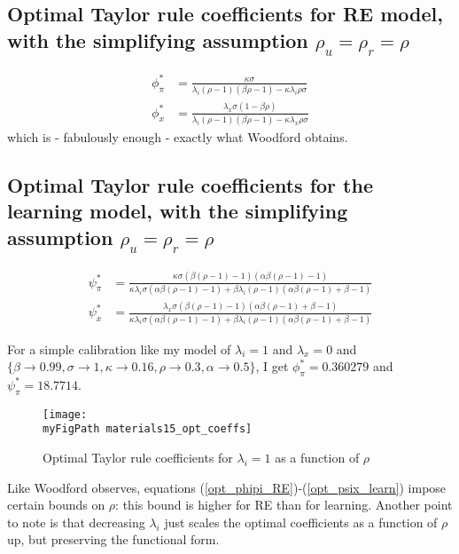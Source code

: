 \documentclass[11pt]{article}
\def \myFigPath {../figures/}
\renewcommand{\[}{\begin{equation}}
\renewcommand{\]}{\end{equation}}
\begin{document}
\newpage
\subsection{Optimal Taylor rule coefficients for RE model, with the simplifying assumption $\rho_u = \rho_r = \rho$}
\begin{align}
\phi_{\pi}^* & = \frac{\kappa  \sigma }{\lambda_i(\rho -1) (\beta  \rho -1)-\kappa  \lambda_i \rho  \sigma } \label{opt_phipi_RE}
\\
\phi_{x}^* & =  \frac{\lambda_x\sigma  (1-\beta  \rho )}{\lambda_i (\rho -1) (\beta  \rho -1)-\kappa  \lambda_x \rho  \sigma } \label{opt_phix_RE}
\end{align}
which is - fabulously enough - exactly what Woodford obtains.
\subsection{Optimal Taylor rule coefficients for the learning model, with the simplifying assumption $\rho_u = \rho_r = \rho$}
\begin{align}
\psi_{\pi}^* & =
\frac{\kappa  \sigma  (\beta  (\rho -1)-1) (\alpha  \beta  (\rho -1)-1)}{\kappa  \lambda_i \sigma  (\alpha  \beta  (\rho -1)-1)+\beta  \lambda_i (\rho -1) (\alpha  \beta  (\rho -1)+\beta -1)} \label{opt_psipi_learn} \\
\psi_{x}^* & = 
\frac{\lambda_x\sigma  (\beta  (\rho -1)-1) (\alpha  \beta  (\rho -1)+\beta -1)}{\kappa  \lambda_i \sigma  (\alpha  \beta  (\rho -1)-1)+\beta  \lambda_i (\rho -1) (\alpha  \beta  (\rho -1)+\beta -1)} \label{opt_psix_learn}
\end{align}

For a simple calibration like my model of $\lambda_i =1$ and $\lambda_x=0$ and
$\{\beta \to 0.99,\sigma \to 1,\kappa \to 0.16,\rho \to 0.3,\alpha \to 0.5\}$, I get $\phi_{\pi}^*=0.360279$ and $\psi_{\pi}^*=18.7714$.

\begin{figure}[h!]
\texttt{[image: \\myFigPath materials15\_opt\_coeffs]}
\caption{Optimal Taylor rule coefficients for $\lambda_i = 1$ as a function of $\rho$}
\end{figure}

Like Woodford observes, equations (\ref{opt_phipi_RE})-(\ref{opt_psix_learn}) impose certain bounds on $\rho$: this bound is higher for RE than for learning. Another point to note is that decreasing $\lambda_i$ just scales the optimal coefficients as a function of $\rho$ up, but preserving the functional form.
\end{document}
